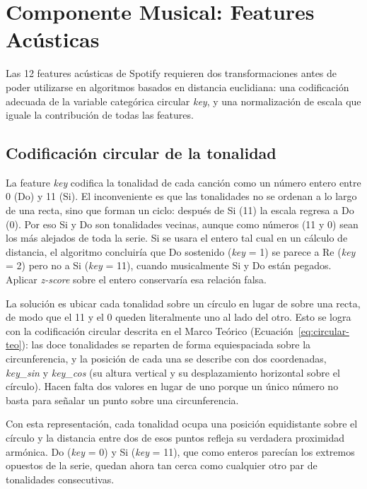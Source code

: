 \section{Componente Musical: Features Acústicas}
\label{sec:componente-musical}

Las 12 features acústicas de Spotify requieren dos transformaciones antes de poder utilizarse en algoritmos basados en distancia euclidiana: una codificación adecuada de la variable categórica circular \textit{key}, y una normalización de escala que iguale la contribución de todas las features.

\subsection{Codificación circular de la tonalidad}
\label{subsec:codificacion-circular}

La feature \textit{key} codifica la tonalidad de cada canción como un número entero entre 0 (Do) y 11 (Si). El inconveniente es que las tonalidades no se ordenan a lo largo de una recta, sino que forman un ciclo: después de Si (11) la escala regresa a Do (0). Por eso Si y Do son tonalidades vecinas, aunque como números (11 y 0) sean los más alejados de toda la serie. Si se usara el entero tal cual en un cálculo de distancia, el algoritmo concluiría que Do sostenido (\textit{key} = 1) se parece a Re (\textit{key} = 2) pero no a Si (\textit{key} = 11), cuando musicalmente Si y Do están pegados. Aplicar \textit{z-score} sobre el entero conservaría esa relación falsa.

La solución es ubicar cada tonalidad sobre un círculo en lugar de sobre una recta, de modo que el 11 y el 0 queden literalmente uno al lado del otro. Esto se logra con la codificación circular descrita en el Marco Teórico (Ecuación~\ref{eq:circular-teo}): las doce tonalidades se reparten de forma equiespaciada sobre la circunferencia, y la posición de cada una se describe con dos coordenadas, \textit{key\_sin} y \textit{key\_cos} (su altura vertical y su desplazamiento horizontal sobre el círculo). Hacen falta dos valores en lugar de uno porque un único número no basta para señalar un punto sobre una circunferencia.

Con esta representación, cada tonalidad ocupa una posición equidistante sobre el círculo y la distancia entre dos de esos puntos refleja su verdadera proximidad armónica. Do (\textit{key} = 0) y Si (\textit{key} = 11), que como enteros parecían los extremos opuestos de la serie, quedan ahora tan cerca como cualquier otro par de tonalidades consecutivas.

